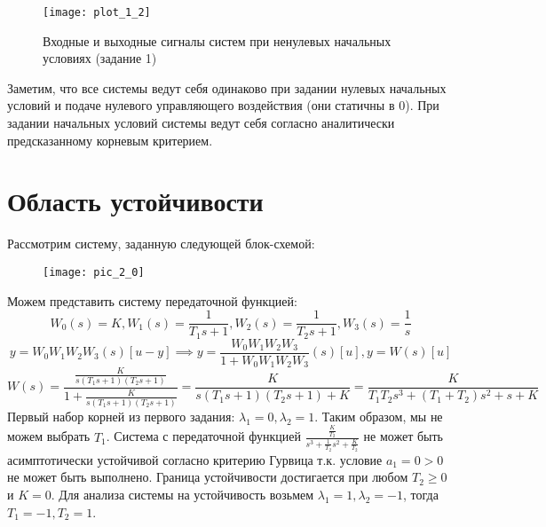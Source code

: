  \begin{figure}[h]
    \centering
    \texttt{[image: plot\_1\_2]}
    \caption{\label{fig:The-caption-1}Входные и выходные сигналы систем при ненулевых начальных условиях (задание 1)}
\end{figure}

Заметим, что все системы ведут себя одинаково при задании нулевых начальных условий 
и подаче нулевого управляющего воздействия (они статичны в 0). При задании начальных условий системы
ведут себя согласно аналитически предсказанному корневым критерием.

\pagebreak

\section{Область устойчивости}
Рассмотрим систему, заданную следующей блок-схемой:
\begin{figure}[h]
    \centering
    \texttt{[image: pic\_2\_0]}
\end{figure}

Можем представить систему передаточной функцией:
\begin{equation*}
    W_0(s) = K, W_1(s) = \frac{1}{T_1 s + 1}, W_2(s) = \frac{1}{T_2 s + 1}, W_3(s)=\frac{1}{s} 
\end{equation*}
\begin{equation*}
    y = W_0W_1W_2W_3(s)[u - y] \implies y = \frac{W_0W_1W_2W_3}{1 + W_0W_1W_2W_3}(s)[u], y = W(s)[u]
\end{equation*}
\begin{equation}
    W(s)=\frac{\frac{K}{s(T_1 s + 1)(T_2 s + 1)}}{1 + \frac{K}{s(T_1 s + 1)(T_2 s + 1)}}=
    \frac{K}{s(T_1 s + 1)(T_2 s + 1) + K}=\frac{K}{T_1 T_2 s^3 + (T_1 + T_2) s^2 + s + K}
\end{equation}
Первый набор корней из первого задания: $\lambda_1 = 0, \lambda_2 = 1$. Таким образом, мы 
не можем выбрать $T_1$. Система с передаточной функцией $\frac{\frac{K}{T_2}}{s^3 + \frac{1}{T_2}s^2 + \frac{K}{T_2}}$
не может быть асимптотически устойчивой согласно критерию Гурвица т.к. условие $a_1 = 0 > 0$ не может быть выполнено.
Граница устойчивости достигается при любом $T_2 \ge 0$ и $K=0$.
Для анализа системы на устойчивость возьмем $\lambda_1 = 1, \lambda_2 = -1$, тогда $T_1=-1, T_2=1$.


